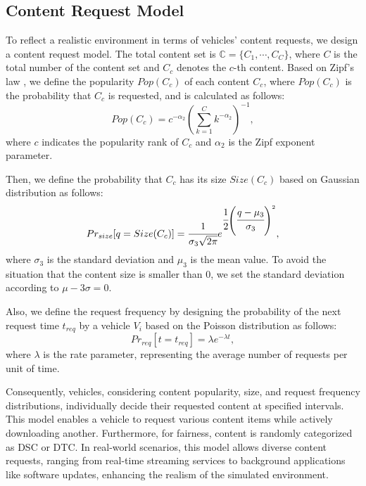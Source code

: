 \documentclass[journal]{IEEEtran}
\begin{document}
\subsection{Content Request Model}
To reflect a realistic environment in terms of vehicles' content requests, we design a content request model.
The total content set is $\mathbb{C}=\{C_{1}, \cdots, C_{C}\}$, where $C$ is the total number of the content set and $C_{c}$ denotes the $c$-th content.
Based on Zipf's law \cite{Zipf}, we define the popularity $Pop(C_{c})$ of each content $C_{c}$, where $Pop(C_{c})$ is the probability that $C_{c}$ is requested, and is calculated as follows:
\begin{equation}
    Pop(C_{c})=c^{-\alpha_{2}}\left(\sum^{C}_{k=1}k^{-\alpha_{2}}\right)^{-1},
\end{equation}
where $c$ indicates the popularity rank of $C_{c}$ and $\alpha_{2}$ is the Zipf exponent parameter.

Then, we define the probability that $C_{c}$ has its size $Size(C_{c})$ based on Gaussian distribution as follows:
\begin{equation}
    Pr_{size}[q=Size(C_{c})]=\cfrac{1}{\sigma_{3}\sqrt{2\pi}}e^{\cfrac{1}{2}\left( \cfrac{q-\mu_{3}}{\sigma_{3}}\right)^{2}},
\end{equation}
where $\sigma_{3}$ is the standard deviation and $\mu_{3}$ is the mean value.
To avoid the situation that the content size is smaller than 0, we set the standard deviation according to $\mu-3\sigma = 0$.

Also, we define the request frequency by designing the probability of the next request time $t_{req}$ by a vehicle $V_{i}$ based on the Poisson distribution as follows:
\begin{equation}
    Pr_{req}[t=t_{req}]=\lambda e^{-\lambda t},
\end{equation}
where $\lambda$ is the rate parameter, representing the average number of requests per unit of time.

Consequently, vehicles, considering content popularity, size, and request frequency distributions, individually decide their requested content at specified intervals.
This model enables a vehicle to request various content items while actively downloading another.
Furthermore, for fairness, content is randomly categorized as DSC or DTC.
In real-world scenarios, this model allows diverse content requests, ranging from real-time streaming services to background applications like software updates, enhancing the realism of the simulated environment.
    
\end{document}
